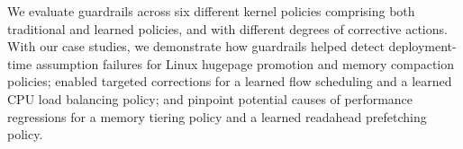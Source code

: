 We evaluate guardrails across six different kernel policies comprising both traditional and learned policies, and with different degrees of corrective actions.
With our case studies, we demonstrate how guardrails helped detect deployment-time assumption failures for Linux hugepage promotion and memory compaction policies; enabled targeted corrections for a learned flow scheduling and a learned CPU load balancing policy; and pinpoint potential causes of performance regressions for a memory tiering policy and a learned readahead prefetching policy.

